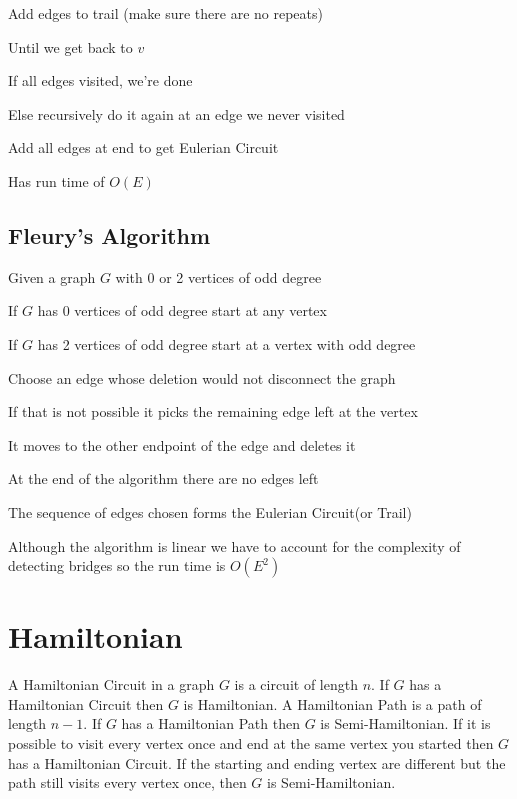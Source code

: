   Add edges to trail (make sure there are no repeats)

  Until we get back to $v$

  If all edges visited, we're done

  Else recursively do it again at an edge we never visited

  Add all edges at end to get Eulerian Circuit

  Has run time of $O(E)$\cite{EulerianAlgos}
  \subsection{Fleury's Algorithm}
  Given a graph $G$ with 0 or  2 vertices of odd degree

  If $G$ has 0 vertices of odd degree start at any vertex

  If $G$ has 2 vertices of odd degree start at a vertex with odd degree

  Choose an edge whose deletion would not disconnect the graph

  If that is not possible it picks the remaining edge left at the vertex

  It moves to the other endpoint of the edge and deletes it

  At the end of the algorithm there are no edges left

  The sequence of edges chosen forms the Eulerian Circuit(or Trail)

  Although the algorithm is linear we have to account for the complexity of detecting bridges so the run time is $O(E^2)$\cite{EulerianAlgos}
 

  
  \section{Hamiltonian}
  A Hamiltonian Circuit in a graph $G$ is a circuit of length $n$. If $G$ has a Hamiltonian Circuit then $G$ is Hamiltonian. A Hamiltonian Path is a path of length $n-1$. If $G$ has a Hamiltonian Path then $G$ is Semi-Hamiltonian. If it is possible to visit every vertex once and end at the same vertex you started then $G$ has a Hamiltonian Circuit. If the starting and ending vertex are different but the path still visits every vertex once, then $G$ is Semi-Hamiltonian.

